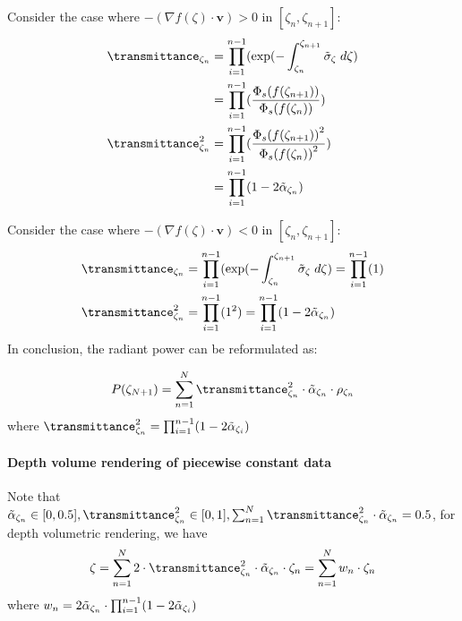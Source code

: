 Consider the case where $-(\nabla f(\zeta)\cdot \mathbf{v}) > 0$ in $[\zeta_n, \zeta_{n+1}]$: 
%
\begin{align}
\transmittance_{\zeta_n} 
&=\prod_{i=1}^{n-1}(\exp(-\int_{\zeta_n}^{\zeta_{n+1}}\tilde{\density}_\zeta \; d\zeta) \\
&= \prod_{i=1}^{n-1}(\frac{\Phi_s(f(\zeta_{n+1}))}{\Phi_s(f(\zeta_n))})\\
\transmittance^2_{\zeta_n}
&= \prod_{i=1}^{n-1}(\frac{{\Phi_s(f(\zeta_{n+1}))}^2}{{\Phi_s(f(\zeta_n))}^2})\\
&= \prod_{i=1}^{n-1}(1-2\tilde{\weight}_{\zeta_n})
\label{eq:dicrete_transmittance}
\end{align}

Consider the case where $-(\nabla f(\zeta)\cdot \mathbf{v}) < 0$ in $[\zeta_n, \zeta_{n+1}]$: 
\begin{align}
\transmittance_{\zeta_n} 
&=\prod_{i=1}^{n-1}(\exp(-\int_{\zeta_n}^{\zeta_{n+1}}\tilde{\density}_\zeta \; d\zeta) = \prod_{i=1}^{n-1}(1)
\\
\transmittance^2_{\zeta_n} &= \prod_{i=1}^{n-1}(1^2) = \prod_{i=1}^{n-1}(1-2\tilde{\weight}_{\zeta_n})
\end{align}
In conclusion, the radiant power can be reformulated as:

\begin{align}
P(\zeta_{N+1}) = \sum_{n=1}^N \transmittance^2_{\zeta_n} \cdot \tilde{\weight}_{\zeta_n} \cdot \reflectivity_{\zeta_n}
\label{eq:final_radiant2}
\end{align}
where $\transmittance^2_{\zeta_n} = \prod_{i=1}^{n-1}(1-2\tilde{\weight}_{\zeta_i})$


\paragraph{Depth volume rendering of piecewise constant data}

Note that $\tilde{\weight}_{\zeta_n} \in [0, 0.5], \transmittance^2_{\zeta_n} \in [0,1], \sum_{n=1}^N \transmittance^2_{\zeta_n} \cdot \tilde{\weight}_{\zeta_n} = 0.5$, for depth volumetric rendering, we have 
\begin{align}
    \zeta = \sum_{n=1}^N 2 \cdot \transmittance^2_{\zeta_n} \cdot \tilde{\weight}_{\zeta_n} \cdot \zeta_n
    =\sum_{n=1}^N w_n \cdot \zeta_n
    \label{eq:depth_render}
\end{align}
where $w_n = 2\tilde{\alpha}_{\zeta_n} \cdot \prod_{i=1}^{n-1}(1-2\tilde{\alpha}_{\zeta_i})$